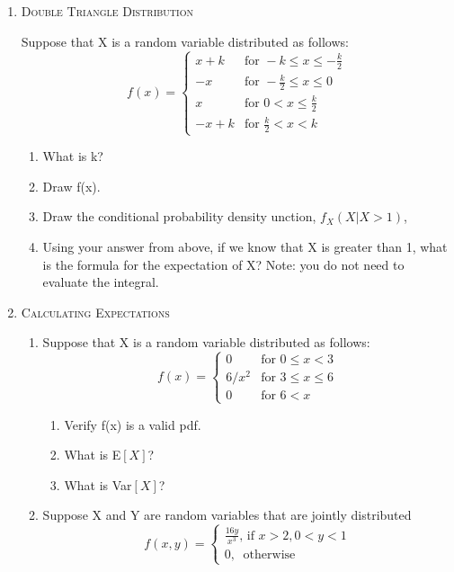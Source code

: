 \documentclass[11pt,letterpaper]{article}
\theoremstyle{definition}
\numberwithin{equation}{section}
\begin{document}
\begin{enumerate}[I]
\item \textsc{Double Triangle Distribution} 

Suppose that X is a random variable distributed as follows:
$$f(x)=\begin{cases} x+k & \text{for } -k\leq x \leq -\frac{k}{2}\\  -x & \text{for } -\frac{k}{2} \leq x \leq 0\\ x  & \text{for } 0<x\leq\frac{k}{2}\\ -x+k& \text{for } \frac{k}{2}<x<k \end{cases}$$
\begin{enumerate}[1)]
\item What is k?%
\item Draw f(x).
\item Draw the conditional probability density unction, $f_X(X|X>1)$,
\item Using your answer from above, if we know that X is greater than 1, what is the formula for the expectation of X?  Note: you do not need to evaluate the integral.
\end{enumerate}

\pagebreak
\item \textsc{Calculating Expectations}
\begin{enumerate}[1)]

\item Suppose that X is a random variable distributed as follows:
$$f(x)=\begin{cases} 0 & \text{for } 0\leq x < 3 \\ 6/x^2  & \text{for }  3\leq x\leq 6\\ 0 &\text{for } 6< x
\end{cases}$$
\begin{enumerate}[1)]
\item Verify f(x) is a valid pdf. %
\item What is E$[X]$? %
\item What is Var$[X]$?%

\end{enumerate}
\item Suppose X and Y are random variables that are jointly distributed 
$$f(x,y)=\begin{cases} \frac{16y}{x^3} \text{, if }x>2, 0<y<1\\ 0, \ \text{ otherwise }\end{cases}$$


\end{enumerate}
\end{enumerate}
\end{document}
